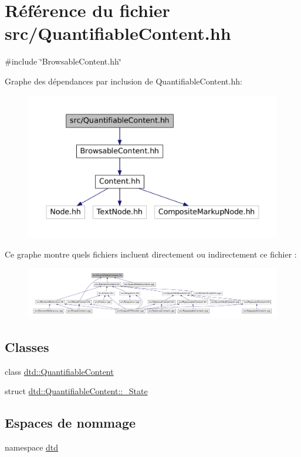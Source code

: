\hypertarget{_quantifiable_content_8hh}{
\section{Référence du fichier src/QuantifiableContent.hh}
\label{_quantifiable_content_8hh}
}
{\ttfamily \#include \char`\"{}BrowsableContent.hh\char`\"{}}\par
Graphe des dépendances par inclusion de QuantifiableContent.hh:\nopagebreak
\begin{figure}[H]
\begin{center}
\leavevmode
\includegraphics[width=400pt]{_quantifiable_content_8hh__incl}
\end{center}
\end{figure}
Ce graphe montre quels fichiers incluent directement ou indirectement ce fichier :\nopagebreak
\begin{figure}[H]
\begin{center}
\leavevmode
\includegraphics[width=400pt]{_quantifiable_content_8hh__dep__incl}
\end{center}
\end{figure}
\subsection*{Classes}
\begin{DoxyCompactItemize}
\item 
class \hyperlink{classdtd_1_1_quantifiable_content}{dtd::QuantifiableContent}
\item 
struct \hyperlink{structdtd_1_1_quantifiable_content_1_1___state}{dtd::QuantifiableContent::\_\-State}
\end{DoxyCompactItemize}
\subsection*{Espaces de nommage}
\begin{DoxyCompactItemize}
\item 
namespace \hyperlink{namespacedtd}{dtd}
\end{DoxyCompactItemize}
